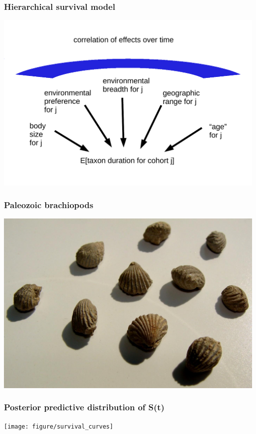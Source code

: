 \documentclass{beamer}
\begin{document}
\begin{frame}
  \frametitle{Hierarchical survival model}
  \begin{center}
    \includegraphics[width = \textwidth,height = 0.8\textheight,keepaspectratio = true]{figure/simple_model}
  \end{center}
\end{frame}

\begin{frame}
  \frametitle{Paleozoic brachiopods}
  \begin{center}
    \includegraphics[width = \textwidth,height = 0.8\textheight,keepaspectratio = true]{figure/permian_brac}
  \end{center}
\end{frame}

\begin{frame}
  \frametitle{Posterior predictive distribution of S(t)}

  \begin{center}
    \texttt{[image: figure/survival\_curves]}
  \end{center}
\end{frame}
\end{document}
